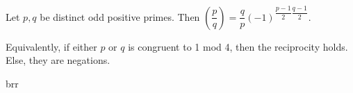 \documentclass[twoside, 10pt]{article}
\begin{document}
\begin{defn}
    Let $p, q$ be distinct odd positive primes. Then $\left(\dfrac{p}{q}\right) = \dfrac{q}{p}(-1)^{\dfrac{p-1}{2}\dfrac{q-1}{2}}$.
\end{defn}
Equivalently, if either $p$ or $q$ is congruent to 1 mod 4, then the reciprocity holds. Else, they are negations.
\begin{defn} 
    brr
\end{defn}
\end{document}

